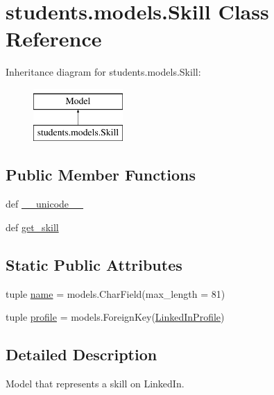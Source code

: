 \hypertarget{classstudents_1_1models_1_1_skill}{\section{students.\-models.\-Skill Class Reference}
\label{classstudents_1_1models_1_1_skill}
}
Inheritance diagram for students.\-models.\-Skill\-:\begin{figure}[H]
\begin{center}
\leavevmode
\includegraphics[height=2.000000cm]{classstudents_1_1models_1_1_skill}
\end{center}
\end{figure}
\subsection*{Public Member Functions}
\begin{DoxyCompactItemize}
\item 
def \hyperlink{classstudents_1_1models_1_1_skill_aef95ddd6ca24a649025dca066439af78}{\-\_\-\-\_\-unicode\-\_\-\-\_\-}
\item 
def \hyperlink{classstudents_1_1models_1_1_skill_a44f6a7c6975253c8f617f36c4400f19c}{get\-\_\-skill}
\end{DoxyCompactItemize}
\subsection*{Static Public Attributes}
\begin{DoxyCompactItemize}
\item 
tuple \hyperlink{classstudents_1_1models_1_1_skill_a5c22b1127793cd1ea56874c792f83c68}{name} = models.\-Char\-Field(max\-\_\-length = 81)
\item 
tuple \hyperlink{classstudents_1_1models_1_1_skill_aeb30b2427a9875143ebd154fd1a9503e}{profile} = models.\-Foreign\-Key(\hyperlink{classstudents_1_1models_1_1_linked_in_profile}{Linked\-In\-Profile})
\end{DoxyCompactItemize}


\subsection{Detailed Description}
\begin{DoxyVerb}Model that represents a skill on LinkedIn.
\end{DoxyVerb}
 

